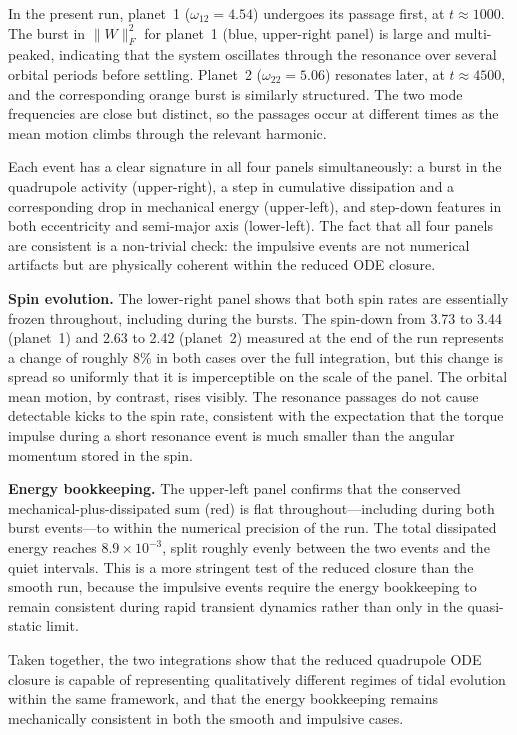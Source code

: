 \documentclass[journal, a4paper]{IEEEtran}
\begin{document}
In the present run, planet~1 ($\omega_{12} = 4.54$) undergoes its passage
first, at $t \approx 1000$. The burst in $\|W\|_F^2$ for planet~1 (blue,
upper-right panel) is large and multi-peaked, indicating that the system
oscillates through the resonance over several orbital periods before settling.
Planet~2 ($\omega_{22} = 5.06$) resonates later, at $t \approx 4500$, and
the corresponding orange burst is similarly structured. The two mode
frequencies are close but distinct, so the passages occur at different times
as the mean motion climbs through the relevant harmonic.

Each event has a clear signature in all four panels simultaneously: a burst
in the quadrupole activity (upper-right), a step in cumulative dissipation
and a corresponding drop in mechanical energy (upper-left), and step-down
features in both eccentricity and semi-major axis (lower-left). The fact
that all four panels are consistent is a non-trivial check: the impulsive
events are not numerical artifacts but are physically coherent within the
reduced ODE closure.

\textbf{Spin evolution.}
The lower-right panel shows that both spin rates are essentially frozen
throughout, including during the bursts. The spin-down from 3.73 to 3.44
(planet~1) and 2.63 to 2.42 (planet~2) measured at the end of the run
represents a change of roughly 8\% in both cases over the full integration,
but this change is spread so uniformly that it is imperceptible on the
scale of the panel. The orbital mean motion, by contrast, rises visibly.
The resonance passages do not cause detectable kicks to the spin rate,
consistent with the expectation that the torque impulse during a short
resonance event is much smaller than the angular momentum stored in the spin.

\textbf{Energy bookkeeping.}
The upper-left panel confirms that the conserved mechanical-plus-dissipated
sum (red) is flat throughout---including during both burst events---to within
the numerical precision of the run. The total dissipated energy reaches
$8.9 \times 10^{-3}$, split roughly evenly between the two events and the
quiet intervals. This is a more stringent test of the reduced closure than
the smooth run, because the impulsive events require the energy bookkeeping
to remain consistent during rapid transient dynamics rather than only in the
quasi-static limit.

Taken together, the two integrations show that the reduced quadrupole ODE
closure is capable of representing qualitatively different regimes of tidal
evolution within the same framework, and that the energy bookkeeping remains
mechanically consistent in both the smooth and impulsive cases.
\end{document}
